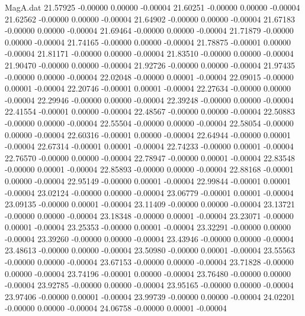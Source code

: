 \begin{filecontents}{MagA.dat}
  21.57925   -0.00000    0.00000   -0.00004
  21.60251   -0.00000    0.00000   -0.00004
  21.62562   -0.00000    0.00000   -0.00004
  21.64902   -0.00000    0.00000   -0.00004
  21.67183   -0.00000    0.00000   -0.00004
  21.69464   -0.00000    0.00000   -0.00004
  21.71879   -0.00000    0.00000   -0.00004
  21.74165   -0.00000    0.00000   -0.00004
  21.78875   -0.00001    0.00000   -0.00004
  21.81171   -0.00000    0.00000   -0.00004
  21.83510   -0.00000    0.00000   -0.00004
  21.90470   -0.00000    0.00000   -0.00004
  21.92726   -0.00000    0.00000   -0.00004
  21.97435   -0.00000    0.00000   -0.00004
  22.02048   -0.00000    0.00001   -0.00004
  22.09015   -0.00000    0.00001   -0.00004
  22.20746   -0.00001    0.00001   -0.00004
  22.27634   -0.00000    0.00000   -0.00004
  22.29946   -0.00000    0.00000   -0.00004
  22.39248   -0.00000    0.00000   -0.00004
  22.41554   -0.00001    0.00000   -0.00004
  22.48567   -0.00000    0.00000   -0.00004
  22.50883   -0.00000    0.00000   -0.00004
  22.55504   -0.00000    0.00000   -0.00004
  22.58054   -0.00000    0.00000   -0.00004
  22.60316   -0.00001    0.00000   -0.00004
  22.64944   -0.00000    0.00001   -0.00004
  22.67314   -0.00001    0.00001   -0.00004
  22.74233   -0.00000    0.00001   -0.00004
  22.76570   -0.00000    0.00000   -0.00004
  22.78947   -0.00000    0.00001   -0.00004
  22.83548   -0.00000    0.00001   -0.00004
  22.85893   -0.00000    0.00000   -0.00004
  22.88168   -0.00001    0.00000   -0.00004
  22.95149   -0.00000    0.00001   -0.00004
  22.99844   -0.00001    0.00001   -0.00004
  23.02124   -0.00000    0.00000   -0.00004
  23.06779   -0.00001    0.00001   -0.00004
  23.09135   -0.00000    0.00001   -0.00004
  23.11409   -0.00000    0.00000   -0.00004
  23.13721   -0.00000    0.00000   -0.00004
  23.18348   -0.00000    0.00001   -0.00004
  23.23071   -0.00000    0.00001   -0.00004
  23.25353   -0.00000    0.00001   -0.00004
  23.32291   -0.00000    0.00000   -0.00004
  23.39260   -0.00000    0.00000   -0.00004
  23.43946   -0.00000    0.00000   -0.00004
  23.48613   -0.00000    0.00000   -0.00004
  23.50980   -0.00000    0.00001   -0.00004
  23.55563   -0.00000    0.00000   -0.00004
  23.67153   -0.00000    0.00000   -0.00004
  23.71828   -0.00000    0.00000   -0.00004
  23.74196   -0.00001    0.00000   -0.00004
  23.76480   -0.00000    0.00000   -0.00004
  23.92785   -0.00000    0.00000   -0.00004
  23.95165   -0.00000    0.00000   -0.00004
  23.97406   -0.00000    0.00001   -0.00004
  23.99739   -0.00000    0.00000   -0.00004
  24.02201   -0.00000    0.00000   -0.00004
  24.06758   -0.00000    0.00001   -0.00004

\end{filecontents}
